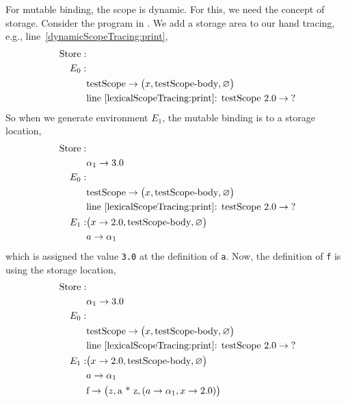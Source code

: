 For mutable binding, the scope is dynamic. For this, we need the concept of storage. Consider the program in .
%
%
We add a storage area to our hand tracing, e.g., line~\ref{dynamicScopeTracing:print},
\begin{align*}
  \text{Store}: &\\
  E_0:&\\
      &\text{testScope} \rightarrow \big(x, \text{testScope-body}, \varnothing\big)\\
      & \text{line~\ref{lexicalScopeTracing:print}: testScope 2.0} \rightarrow \text{?}\\
\end{align*}
So when we generate environment $E_1$, the mutable binding is to a storage location,
\begin{align*}
  \text{Store}: &\\
  & \alpha_1 \rightarrow 3.0\\
  E_0:&\\
      &\text{testScope} \rightarrow \big(x, \text{testScope-body}, \varnothing\big)\\
      & \text{line~\ref{lexicalScopeTracing:print}: testScope 2.0} \rightarrow \text{?}\\
  E_1: & \big(x\rightarrow 2.0, \text{testScope-body}, \varnothing\big)\\
      & a \rightarrow \alpha_1\\
\end{align*}
which is assigned the value \lstinline!3.0! at the definition of \lstinline!a!. Now, the definition of \lstinline!f! is using the storage location,
\begin{align*}
  \text{Store}: &\\
  & \alpha_1 \rightarrow 3.0\\
  E_0:&\\
      &\text{testScope} \rightarrow \big(x, \text{testScope-body}, \varnothing\big)\\
      & \text{line~\ref{lexicalScopeTracing:print}: testScope 2.0} \rightarrow \text{?}\\
  E_1: & \big(x\rightarrow 2.0, \text{testScope-body}, \varnothing\big)\\
      & a \rightarrow \alpha_1\\
      & \text{f} \rightarrow \big(z, \text{a * z}, (a \rightarrow \alpha_1, x\rightarrow 2.0)\big)\\
\end{align*}
